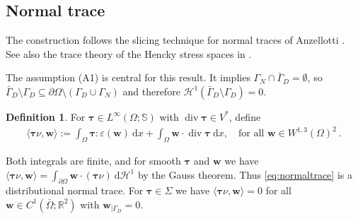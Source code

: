 \documentclass{article}
\theoremstyle{definition}
\newtheorem{definition}{Definition}[section]
\newcommand{\bfw}{\boldsymbol{w}}
\newcommand{\bftau}{\boldsymbol{\tau}}
\newcommand{\dd}{\:\mathrm{d}}
\renewcommand\div{\operatorname{\mathrm{div}}}
\begin{document}
\subsection{Normal trace}
The construction follows the slicing technique for normal traces of Anzellotti \cite{A83}. See also the trace theory of the Hencky stress spaces in \cite{KT83}.

The assumption (A1) is central for this result. It implies $\Gamma_N\cap\bar\Gamma_D = \emptyset$,
so $\bar\Gamma_D \setminus \Gamma_D \subseteq \partial\Omega\setminus(\Gamma_D\cup\Gamma_N)$ and therefore $\mathcal{H}^1(\bar\Gamma_D\setminus\Gamma_D) = 0$.
\begin{definition}
    For $\bftau\in L^\infty(\Omega;\mathbb{S})$ with $\div\bftau\in V^*$, define
    \begin{align}
        \langle \bftau\nu, \bfw \rangle := \int_\Omega \bftau : \varepsilon(\bfw) \dd x + \int_\Omega \bfw \cdot \div \bftau \dd x, \quad\text{for all }\bfw\in W^{1,3}(\Omega)^2\ . \label{eq:normaltrace}
    \end{align}
\end{definition}
Both integrals are finite, and for smooth $\bftau$ and $\bfw$ we have
$\langle \bftau\nu, \bfw \rangle = \int_{\partial\Omega} \bfw \cdot (\bftau \nu) \dd \mathcal{H}^1$ by the Gauss theorem. Thus \eqref{eq:normaltrace} is a distributional normal trace. For $\bftau \in \Sigma$ we have
$\langle\bftau\nu,\bfw\rangle = 0$ for all $\bfw \in C^1(\bar\Omega; \mathbb R^2)$ with $\bfw_{|\Gamma_D} =0$.
\end{document}
